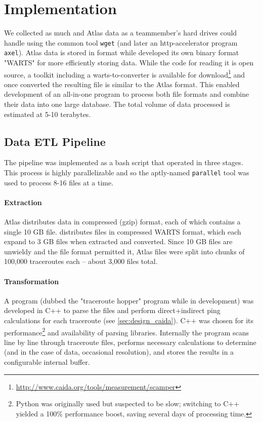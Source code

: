 \section{Implementation}\label{sec:caida_impl}

We collected as much \caida and \ripe Atlas data as a teammember's hard drives could handle using the common tool \texttt{wget} (and later an http-accelerator program \texttt{axel}). \ripe Atlas data is stored in \json format while \caida developed its own binary format "WARTS" for more efficiently storing data. While the code for reading it is open source, a toolkit including a warts-to-\json converter is available for download\footnote{\url{http://www.caida.org/tools/measurement/scamper}} and once converted the resulting \json file is similar to the \ripe Atlas format. This enabled development of an all-in-one \etl program to process both file formats and combine their data into one large database. The total volume of data processed is estimated at 5-10 terabytes.

\subsection{Data ETL Pipeline}

The pipeline was implemented as a bash script that operated in three stages. This process is highly parallelizable and so the aptly-named \texttt{parallel} tool \cite{Tange2011} was used to process 8-16 files at a time.

\paragraph{Extraction} \ripe Atlas distributes data in compressed (gzip) format, each of which contains a single 10 GB \json file. \caida distributes files in compressed WARTS format, which each expand to 3 GB \json files when extracted and converted. Since 10 GB files are unwieldy and the file format permitted it, \ripe Atlas files were split into chunks of 100,000 traceroutes each -- about 3,000 files total.

\paragraph{Transformation} A program (dubbed the "traceroute hopper" program while in development) was developed in C++ to parse the \json files and perform direct+indirect ping calculations for each traceroute (see \cref{sec:design_caida}). C++ was chosen for its performance\footnote{Python was originally used but suspected to be slow; switching to C++ yielded a 100\% performance boost, saving several days of processing time.} and availability of \json parsing libraries. Internally the program scans line by line through traceroute \json files, performs necessary calculations to determine \rtts (and in the case of \caida data, occasional \dns resolution), and stores the results in a configurable internal buffer.

